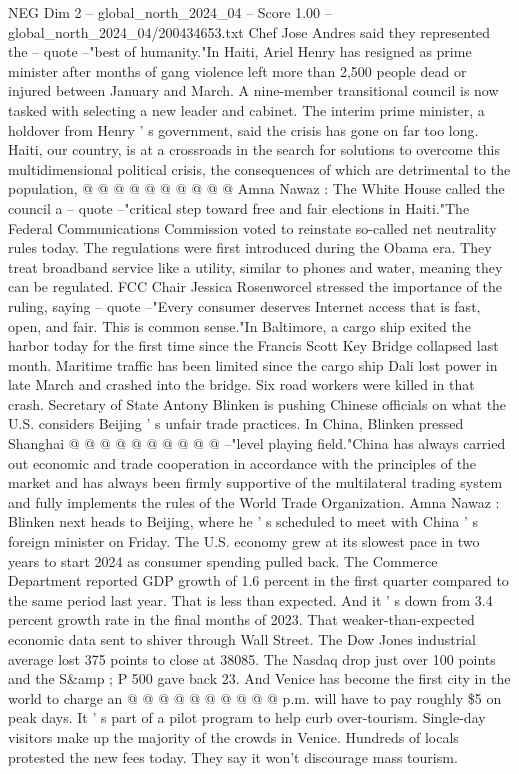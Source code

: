 \begin{textsample}{NEG Dim 2 – global\_north\_2024\_04 – Score 1.00 – global\_north\_2024\_04/200434653.txt}
Chef Jose Andres said they represented the -- quote --"best of humanity."In Haiti, Ariel Henry has resigned as prime minister after months of gang violence left more than 2,500 people dead or injured between January and March.
A nine-member transitional council is now tasked with selecting a new leader and cabinet.
The interim prime minister, a holdover from Henry ' s government, said the crisis has gone on far too long.
Haiti, our country, is at a crossroads in the search for solutions to overcome this multidimensional political crisis, the consequences of which are detrimental to the population, @ @ @ @ @ @ @ @ @ @ Amna Nawaz : The White House called the council a -- quote --"critical step toward free and fair elections in Haiti."The Federal Communications Commission voted to reinstate so-called net neutrality rules today.
The regulations were first introduced during the Obama era.
They treat broadband service like a utility, similar to phones and water, meaning they can be regulated.
FCC Chair Jessica Rosenworcel stressed the importance of the ruling, saying -- quote --"Every consumer deserves Internet access that is fast, open, and fair.
This is common sense."In Baltimore, a cargo ship exited the harbor today for the first time since the Francis Scott Key Bridge collapsed last month.
Maritime traffic has been limited since the cargo ship Dali lost power in late March and crashed into the bridge.
Six road workers were killed in that crash.
Secretary of State Antony Blinken is pushing Chinese officials on what the U.S. considers Beijing ' s unfair trade practices.
In China, Blinken pressed Shanghai @ @ @ @ @ @ @ @ @ @ --"level playing field."China has always carried out economic and trade cooperation in accordance with the principles of the market and has always been firmly supportive of the multilateral trading system and fully implements the rules of the World Trade Organization.
Amna Nawaz : Blinken next heads to Beijing, where he ' s scheduled to meet with China ' s foreign minister on Friday.
The U.S. economy grew at its slowest pace in two years to start 2024 as consumer spending pulled back.
The Commerce Department reported GDP growth of 1.6 percent in the first quarter compared to the same period last year.
That is less than expected.
And it ' s down from 3.4 percent growth rate in the final months of 2023.
That weaker-than-expected economic data sent to shiver through Wall Street.
The Dow Jones industrial average lost 375 points to close at 38085.
The Nasdaq drop just over 100 points and the S\&amp ; P 500 gave back 23.
And Venice has become the first city in the world to charge an @ @ @ @ @ @ @ @ @ @ p.m. will have to pay roughly \$5 on peak days.
It ' s part of a pilot program to help curb over-tourism.
Single-day visitors make up the majority of the crowds in Venice.
Hundreds of locals protested the new fees today.
They say it won't discourage mass tourism.

\end{textsample}
